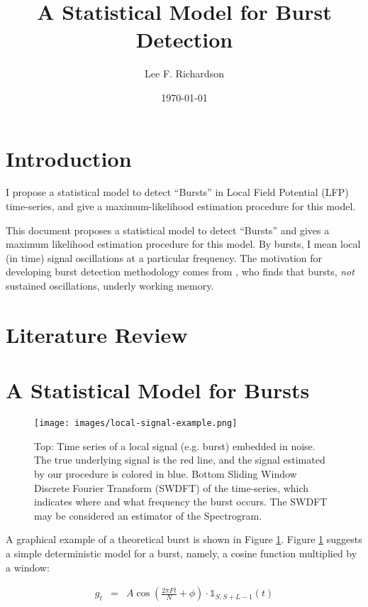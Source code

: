 \documentclass[11pt]{article}
\theoremstyle{plain}
\theoremstyle{definition}
\begin{document}
\title{{\Large A Statistical Model for Burst Detection}}
\author{Lee F. Richardson}
\date{\today}
\maketitle

\section{Introduction}
I propose a statistical model to detect ``Bursts'' in Local Field Potential (LFP) time-series, and give a maximum-likelihood estimation procedure for this model. 

This document proposes a statistical model to detect ``Bursts'' and gives a maximum likelihood estimation procedure for this model. By bursts, I mean local (in time) signal oscillations at a particular frequency. The motivation for developing burst detection methodology comes from \cite{lundqvist2016gamma}, who finds that bursts, {\it not} sustained oscillations, underly working memory. 

\section{Literature Review}
\label{sec:lit-review}

\section{A Statistical Model for Bursts}
\label{sec:model}

\begin{figure}[!ht]
  \centering
  \texttt{[image: images/local-signal-example.png]}
  \caption{Top: Time series of a local signal (e.g. burst) embedded in noise. The true underlying signal is the red line, and the signal estimated by our procedure is colored in blue. Bottom Sliding Window Discrete Fourier Transform (SWDFT) of the time-series, which indicates where and what frequency the burst occurs. The SWDFT may be considered an estimator of the Spectrogram.}
\label{fig:theoretical-burst}
\end{figure}

A graphical example of a theoretical burst is shown in Figure \ref{fig:theoretical-burst}. Figure \ref{fig:theoretical-burst} suggests a simple deterministic model for a burst, namely, a cosine function multiplied by a window:

\begin{eqnarray}
	\label{eq:deterministic}
	g_t &=& A \cos(\frac{2 \pi F t}{N} + \phi) \cdot \mathbb{1}_{S, S + L - 1}(t)
\end{eqnarray}
\end{document}
